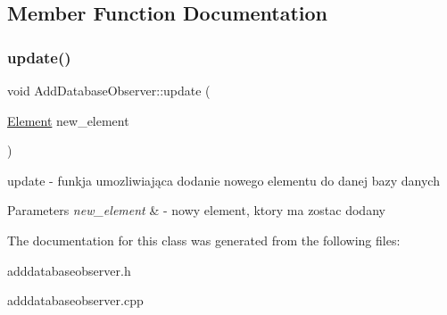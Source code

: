 \subsection{Member Function Documentation}
\mbox{\label{class_add_database_observer_a6f2bc1af6f2887b326c40d2efec9cf42}} 
\subsubsection{\texorpdfstring{update()}{update()}}
{\footnotesize\ttfamily void Add\+Database\+Observer\+::update (\begin{DoxyParamCaption}\item[{\mbox{\hyperlink{class_element}{Element}}}]{new\+\_\+element }\end{DoxyParamCaption})\hspace{0.3cm}{\ttfamily [virtual]}}



update -\/ funkja umozliwiająca dodanie nowego elementu do danej bazy danych 


\begin{DoxyParams}{Parameters}
{\em new\+\_\+element} & -\/ nowy element, ktory ma zostac dodany \\
\hline
\end{DoxyParams}


The documentation for this class was generated from the following files\+:\begin{DoxyCompactItemize}
\item 
adddatabaseobserver.\+h\item 
adddatabaseobserver.\+cpp\end{DoxyCompactItemize}
